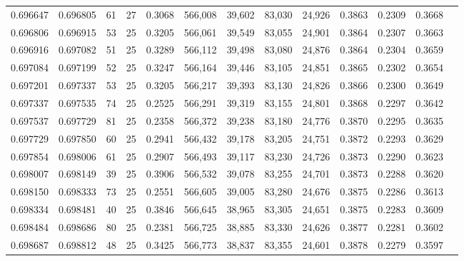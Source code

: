\begin{tabular}{rrrrrrrrrrrrr}
0.696647 & 0.696805 &    61 &  27 &                                     0.3068 & 566,008 &  39,602 &  83,030 &  24,926 & 0.3863 & 0.2309 & 0.3668 \\
0.696806 & 0.696915 &    53 &  25 &                                     0.3205 & 566,061 &  39,549 &  83,055 &  24,901 & 0.3864 & 0.2307 & 0.3663 \\
0.696916 & 0.697082 &    51 &  25 &                                     0.3289 & 566,112 &  39,498 &  83,080 &  24,876 & 0.3864 & 0.2304 & 0.3659 \\
0.697084 & 0.697199 &    52 &  25 &                                     0.3247 & 566,164 &  39,446 &  83,105 &  24,851 & 0.3865 & 0.2302 & 0.3654 \\
0.697201 & 0.697337 &    53 &  25 &                                     0.3205 & 566,217 &  39,393 &  83,130 &  24,826 & 0.3866 & 0.2300 & 0.3649 \\
0.697337 & 0.697535 &    74 &  25 &                                     0.2525 & 566,291 &  39,319 &  83,155 &  24,801 & 0.3868 & 0.2297 & 0.3642 \\
0.697537 & 0.697729 &    81 &  25 &                                     0.2358 & 566,372 &  39,238 &  83,180 &  24,776 & 0.3870 & 0.2295 & 0.3635 \\
0.697729 & 0.697850 &    60 &  25 &                                     0.2941 & 566,432 &  39,178 &  83,205 &  24,751 & 0.3872 & 0.2293 & 0.3629 \\
0.697854 & 0.698006 &    61 &  25 &                                     0.2907 & 566,493 &  39,117 &  83,230 &  24,726 & 0.3873 & 0.2290 & 0.3623 \\
0.698007 & 0.698149 &    39 &  25 &                                     0.3906 & 566,532 &  39,078 &  83,255 &  24,701 & 0.3873 & 0.2288 & 0.3620 \\
0.698150 & 0.698333 &    73 &  25 &                                     0.2551 & 566,605 &  39,005 &  83,280 &  24,676 & 0.3875 & 0.2286 & 0.3613 \\
0.698334 & 0.698481 &    40 &  25 &                                     0.3846 & 566,645 &  38,965 &  83,305 &  24,651 & 0.3875 & 0.2283 & 0.3609 \\
0.698484 & 0.698686 &    80 &  25 &                                     0.2381 & 566,725 &  38,885 &  83,330 &  24,626 & 0.3877 & 0.2281 & 0.3602 \\
0.698687 & 0.698812 &    48 &  25 &                                     0.3425 & 566,773 &  38,837 &  83,355 &  24,601 & 0.3878 & 0.2279 & 0.3597 \\

\end{tabular}
